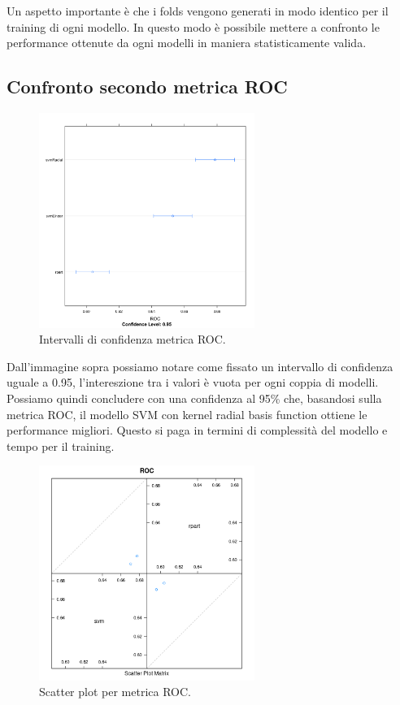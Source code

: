 Un aspetto importante è che i folds vengono generati in modo identico per il training di ogni modello. In questo modo è possibile mettere a confronto le performance ottenute da ogni modelli in maniera statisticamente valida.

\subsection{Confronto secondo metrica ROC}

\begin{figure}[H]
	\centering
	\includegraphics[width=7cm]{../images/compare_dot_plot.png}
	\caption{Intervalli di confidenza metrica ROC.}
	\label{fig:compare_dot_plot}
\end{figure}
Dall'immagine sopra possiamo notare come fissato un intervallo di confidenza uguale a 0.95, l'intereszione tra i valori è vuota per ogni coppia di modelli. Possiamo quindi concludere con una confidenza al 95\% che, basandosi sulla metrica ROC, il modello SVM con kernel radial basis function ottiene le performance migliori. Questo si paga in termini di complessità del modello e tempo per il training.

\begin{figure}[H]
	\centering
	\includegraphics[width=7cm]{../images/compare_splom_plot.png}
	\caption{Scatter plot per metrica ROC.}
	\label{fig:compare_splom_plot}
\end{figure}

